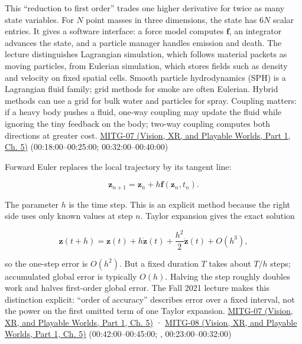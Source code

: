 This ``reduction to first order'' trades one higher derivative for twice as many state variables. For \(N\) point masses in three dimensions, the state has \(6N\) scalar entries. It gives a software interface: a force model computes \(\boldsymbol{f}\), an integrator advances the state, and a particle manager handles emission and death. The lecture distinguishes Lagrangian simulation, which follows material packets as moving particles, from Eulerian simulation, which stores fields such as density and velocity on fixed spatial cells. Smooth particle hydrodynamics (SPH) is a Lagrangian fluid family; grid methods for smoke are often Eulerian. Hybrid methods can use a grid for bulk water and particles for spray. Coupling matters: if a heavy body pushes a fluid, one-way coupling may update the fluid while ignoring the tiny feedback on the body; two-way coupling computes both directions at greater cost. \href{../07-Vision-XR-and-Playable-Worlds-P01/main.pdf\#nameddest=04-visual-computing-ii-ch036-mitg-07---particle-systems}{MITG-07 (Vision, XR, and Playable Worlds, Part 1, Ch. 5)} (00:18:00--00:25:00; 00:32:00--00:40:00)

Forward Euler replaces the local trajectory by its tangent line:

\[
\boldsymbol{z}_{n+1}=\boldsymbol{z}_n+h\boldsymbol{f}(\boldsymbol{z}_n,t_n).
\]

The parameter \(h\) is the time step. This is an explicit method because the right side uses only known values at step \(n\). Taylor expansion gives the exact solution

\[
\boldsymbol{z}(t+h)=\boldsymbol{z}(t)+h\dot{\boldsymbol{z}}(t)
+\frac{h^2}{2}\ddot{\boldsymbol{z}}(t)+O(h^3),
\]

so the one-step error is \(O(h^2)\). But a fixed duration \(T\) takes about \(T/h\) steps; accumulated global error is typically \(O(h)\). Halving the step roughly doubles work and halves first-order global error. The Fall 2021 lecture makes this distinction explicit: ``order of accuracy'' describes error over a fixed interval, not the power on the first omitted term of one Taylor expansion. \href{../07-Vision-XR-and-Playable-Worlds-P01/main.pdf\#nameddest=04-visual-computing-ii-ch036-mitg-07---particle-systems}{MITG-07 (Vision, XR, and Playable Worlds, Part 1, Ch. 5)} · \href{../07-Vision-XR-and-Playable-Worlds-P01/main.pdf\#nameddest=04-visual-computing-ii-ch036-mitg-08---cloth-simulation}{MITG-08 (Vision, XR, and Playable Worlds, Part 1, Ch. 5)} (00:42:00--00:45:00; , 00:23:00--00:32:00)

